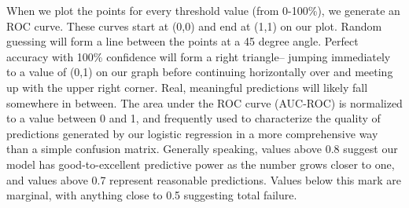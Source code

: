 When we plot the points for every threshold value (from 0-100\%), we generate an ROC curve.  These curves start at (0,0) and end at (1,1) on our plot.  Random guessing will form a line between the points at a 45 degree angle.  Perfect accuracy with 100\% confidence will form a right triangle-- jumping immediately to a value of (0,1) on our graph before continuing horizontally over and meeting up with the upper right corner.  Real, meaningful predictions will likely fall somewhere in between.  The area under the ROC curve (AUC-ROC) is normalized to a value between 0 and 1, and frequently used to characterize the quality of predictions generated by our logistic regression in a more comprehensive way than a simple confusion matrix.  Generally speaking, values above 0.8 suggest our model has good-to-excellent predictive power as the number grows closer to one, and values above 0.7 represent reasonable predictions.  Values below this mark are marginal, with anything close to 0.5 suggesting total failure.
